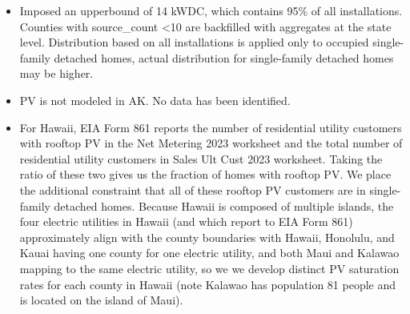 \begin{itemize}
\item Imposed an upperbound of 14 kWDC, which contains 95\% of all installations. Counties with source\_count <10 are backfilled with aggregates at the state level. Distribution based on all installations is applied only to occupied single-family detached  homes, actual distribution for single-family detached homes may be higher.
\item PV is not modeled in AK. No data has been identified.
\item For Hawaii, EIA Form 861 reports the number of residential utility customers with rooftop PV in the Net Metering 2023 worksheet and the total number of residential utility customers in Sales Ult Cust 2023 worksheet. Taking the ratio of these two gives us the fraction of homes with rooftop PV. We place the additional constraint that all of these rooftop PV customers are in single-family detached homes. Because Hawaii is composed of multiple islands, the four electric utilities in Hawaii (and which report to EIA Form 861) approximately align with the county boundaries with Hawaii, Honolulu, and Kauai having one county for one electric utility, and both Maui and Kalawao mapping to the same electric utility, so we we develop distinct PV saturation rates for each county in Hawaii (note Kalawao has population 81 people and is located on the island of Maui).
\end{itemize}
